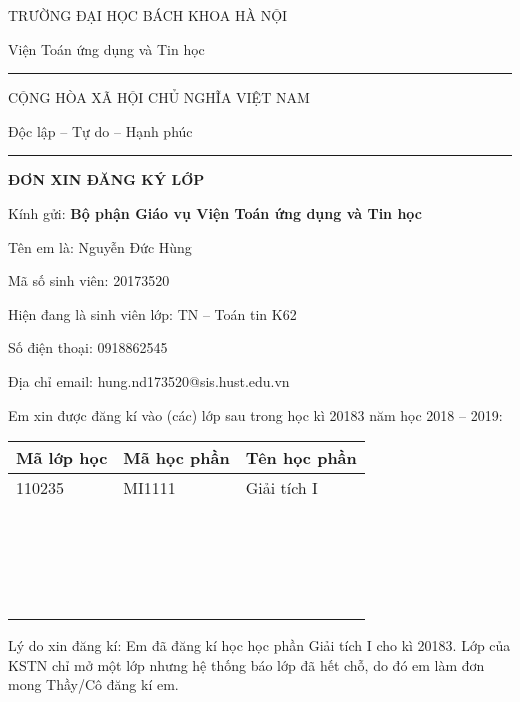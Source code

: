\documentclass[12pt]{memoir}
\begin{document}
\thispagestyle{empty}
\begin{minipage}
	{0.48\textwidth}
	\center
	{TRƯỜNG ĐẠI HỌC BÁCH KHOA HÀ NỘI}\par
	{Viện Toán ứng dụng và Tin học}
	\rule{0.5\textwidth}{0.4pt}
\end{minipage}
\begin{minipage}
	{0.55\textwidth}
	\center
	{CỘNG HÒA XÃ HỘI CHỦ NGHĨA VIỆT NAM}\par
	{Độc lập -- Tự do -- Hạnh phúc}
	\rule{0.5\textwidth}{0.4pt}
\end{minipage}

\vfill
\begin{center}
	\sffamily
	\textbf{\Large ĐƠN XIN ĐĂNG KÝ LỚP}
\end{center}
\vfill

Kính gửi: \textbf{Bộ phận Giáo vụ Viện Toán ứng dụng và Tin học}

\begin{minipage}{0.6\textwidth} Tên em là: Nguyễn Đức Hùng\end{minipage}
\begin{minipage}{0.4\textwidth} Mã số sinh viên: 20173520\end{minipage}

\begin{minipage}{0.6\textwidth} Hiện đang là sinh viên lớp: TN -- Toán tin K62\end{minipage}
\begin{minipage}{0.3\textwidth} Số điện thoại: 0918862545 \end{minipage}

Địa chỉ email: {hung.nd173520@sis.hust.edu.vn}

Em xin được đăng kí vào (các) lớp sau trong học kì 20183 năm học 2018 -- 2019:

\begin{center}
	\begin{tabularx}{\textwidth}{|X|X|X|}
		\hline
	Mã lớp học & Mã học phần & Tên học phần\\\hline
	110235 & MI1111 & Giải tích I\\\hline
	~&~&~\\
	~&~&~\\
	~&~&~\\
	~&~&~\\\hline
\end{tabularx}
\end{center}

Lý do xin đăng kí: Em đã đăng kí học học phần Giải tích I cho kì 20183. Lớp của KSTN chỉ mở một lớp nhưng hệ thống báo lớp đã hết chỗ, do đó em làm đơn mong Thầy/Cô đăng kí em.
\end{document}
